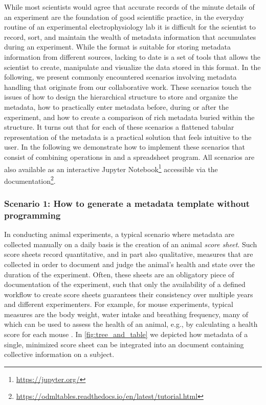 While most scientists would agree that accurate records of the minute details of an experiment are the foundation of good scientific practice, in the everyday routine of an experimental electrophysiology lab it is difficult for the scientist to record, sort, and maintain the wealth of metadata information that accumulates during an experiment. While the  format is suitable for storing metadata information from different sources, lacking to date is a set of tools that allows the scientist to create, manipulate and visualize the data stored in this format. In the following, we present commonly encountered scenarios involving metadata handling that originate from our collaborative work. These scenarios touch the issues of how to design the hierarchical structure to store and organize the metadata, how to practically enter metadata before, during or after the experiment, and how to create a comparison of rich metadata buried within the  structure. It turns out that for each of these scenarios a flattened tabular representation of the metadata is a practical solution that feels intuitive to the user. In the following we demonstrate how to implement these scenarios that consist of combining operations in  and a spreadsheet program. All scenarios are also available as an interactive Jupyter Notebook\footnote{\url{https://jupyter.org/}} accessible via the  documentation\footnote{\url{https://odmltables.readthedocs.io/en/latest/tutorial.html}}.

\subsubsection*{Scenario 1: How to generate a metadata template without programming}
\label{sec:Template-Generation}
In conducting animal experiments, a typical scenario where metadata are collected manually on a daily basis is the creation of an animal \textit{score sheet}. Such score sheets record quantitative, and in part also qualitative, measures that are collected in order to document and judge the animal's health and state over the duration of the experiment. Often, these sheets are an obligatory piece of documentation of the experiment, such that only the availability of a defined workflow to create score sheets guarantees their consistency over multiple years and different experimenters. For example, for mouse experiments, typical measures are the body weight, water intake and breathing frequency, many of which can be used to assess the health of an animal, e.g., by calculating a health score for each mouse \citep{Foltz_1999, Burkholder_2012}. In \cref{fig:tree_and_table} we depicted how metadata of a single, minimized score sheet can be integrated into an  document containing collective information on a subject.

